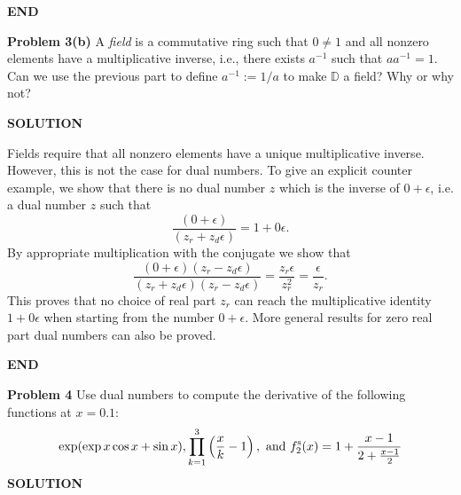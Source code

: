 \documentclass[12pt,a4paper]{article}
\def\bbD{ {\mathbb D} }
\begin{document}
\textbf{END}

\textbf{Problem 3(b)} A \emph{field} is a commutative ring such that $0 \ensuremath{\neq} 1$ and all nonzero elements have a multiplicative inverse, i.e., there exists $a^{-1}$ such that $a a^{-1} = 1$. Can we use the previous part to define $a^{-1} := 1/a$ to make $\ensuremath{\bbD}$ a field? Why or why not?

\textbf{SOLUTION}

Fields require that all nonzero elements have a unique multiplicative inverse. However, this is not the case for dual numbers. To give an explicit counter example, we show that there is no dual number $z$ which is the inverse of $0+\ensuremath{\epsilon}$, i.e. a dual number $z$ such that
\[
\frac{(0+\ensuremath{\epsilon})}{(z_r+z_d \ensuremath{\epsilon})} = 1 + 0 \ensuremath{\epsilon}.
\]
By appropriate multiplication with the conjugate we show that
\[
\frac{(0+\ensuremath{\epsilon})(z_r-z_d \ensuremath{\epsilon})}{(z_r+z_d \ensuremath{\epsilon})(z_r-z_d \ensuremath{\epsilon})} = \frac{z_r \ensuremath{\epsilon}}{z_r^2} = \frac{\ensuremath{\epsilon}}{z_r}.
\]
This proves that no choice of real part $z_r$ can reach the multiplicative identity $1+0 \ensuremath{\epsilon}$ when starting from the number $0+\ensuremath{\epsilon}$. More general results for zero real part dual numbers can also be proved.

\textbf{END}

\textbf{Problem 4} Use dual numbers to compute the derivative of the following functions at $x = 0.1$:
\[
\exp(\exp x \cos x + \sin x), \prod_{k=1}^3 \left({x \over k}-1\right),\hbox{ and } f^{\rm s}_2(x) = {1 + {x - 1 \over 2 + {x-1 \over 2}}}
\]
\textbf{SOLUTION}
\end{document}

